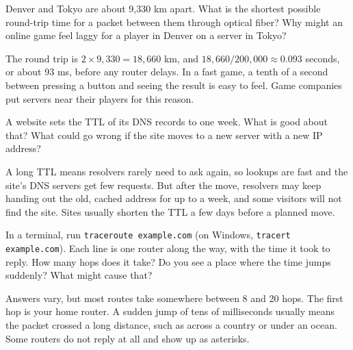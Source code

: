 \begin{Exercise}[title={Around the World}, label=in_light]
Denver and Tokyo are about 9,330 km apart. What is the shortest possible round-trip time for a packet between
them through optical fiber? Why might an online game feel laggy for a player in Denver on a server in Tokyo?
\end{Exercise}
\begin{Answer}[ref=in_light]
The round trip is $2 \times 9{,}330 = 18{,}660$ km, and $18{,}660 / 200{,}000 \approx 0.093$ seconds, or about
93 ms, before any router delays. In a fast game, a tenth of a second between pressing a button and seeing the
result is easy to feel. Game companies put servers near their players for this reason.
\end{Answer}

\begin{Exercise}[title={Caching Trade-off}, label=in_ttl]
A website sets the TTL of its DNS records to one week. What is good about that? What could go wrong if the
site moves to a new server with a new IP address?
\end{Exercise}
\begin{Answer}[ref=in_ttl]
A long TTL means resolvers rarely need to ask again, so lookups are fast and the site's DNS servers get few
requests. But after the move, resolvers may keep handing out the old, cached address for up to a week, and some
visitors will not find the site. Sites usually shorten the TTL a few days before a planned move.
\end{Answer}

\begin{Exercise}[title={Trace a Route}, label=in_trace]
In a terminal, run \verb|traceroute example.com| (on Windows, \verb|tracert example.com|). Each line is one
router along the way, with the time it took to reply. How many hops does it take? Do you see a place where the
time jumps suddenly? What might cause that?
\end{Exercise}
\begin{Answer}[ref=in_trace]
Answers vary, but most routes take somewhere between 8 and 20 hops. The first hop is your home router. A
sudden jump of tens of milliseconds usually means the packet crossed a long distance, such as across a country
or under an ocean. Some routers do not reply at all and show up as asterisks.
\end{Answer}
